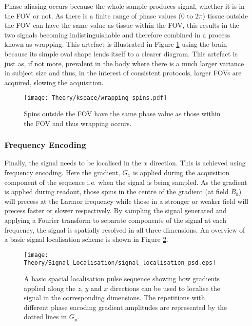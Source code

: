 Phase aliasing occurs because the whole sample produces signal, whether it is in the \ac{FOV} or not. As there is a finite range of phase values ($0$ to $2\pi$) tissue outside the \ac{FOV} can have the same value as tissue within the \ac{FOV}, this results in the two signals becoming indistinguishable and therefore combined in a process known as wrapping. This artefact is illustrated in Figure \ref{fig:theory_wrapping_spins} using the brain because its simple oval shape lends itself to a clearer diagram. This artefact is just as, if not more, prevalent in the body where there is a much larger variance in subject size and thus, in the interest of consistent protocols, larger \acp{FOV} are acquired, slowing the acquisition.
\begin{figure}[H]
	\centering
	\texttt{[image: Theory/kspace/wrapping\_spins.pdf]}
	\caption{Spins outside the \ac{FOV} have the same phase value as those within the \ac{FOV} and thus wrapping occurs.}
	\label{fig:theory_wrapping_spins}	
\end{figure}

\subsubsection{Frequency Encoding}
Finally, the signal needs to be localised in the $x$ direction. This is achieved using frequency encoding. Here the gradient, $G_x$ is applied during the acquisition component of the sequence i.e. when the signal is being sampled. As the gradient is applied during readout, those spins in the centre of the gradient (at field $B_0$) will precess at the Larmor frequency while those in a stronger or weaker field will precess faster or slower respectively. By sampling the signal generated and applying a Fourier transform to separate components of the signal at each frequency, the signal is spatially resolved in all three dimensions. An overview of a basic signal localisation scheme is shown in Figure \ref{fig:theory_signal_loc}.
\begin{figure}[H]
	\centering
	\texttt{[image: Theory/Signal\_Localisation/signal\_localisation\_psd.eps]}
	\caption{A basic spacial localisation pulse sequence showing how gradients applied along the $z$, $y$ and $x$ directions can be used to localise the signal in the corresponding dimensions. The repetitions with different phase encoding gradient amplitudes are represented by the dotted lines in $G_y$.}
	\label{fig:theory_signal_loc}	
\end{figure}


